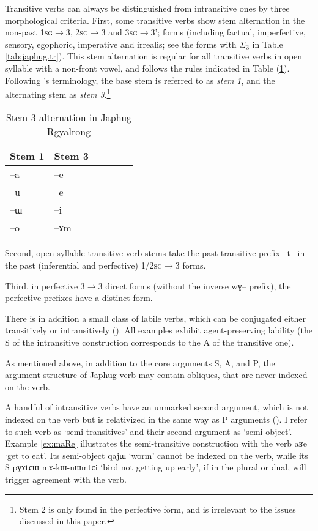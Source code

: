 \documentclass[oldfontcommands,oneside,a4paper,11pt]{article}
\newcommand{\ipa}[1]{{\phon \mbox{#1}}} %
\newcommand{\refb}[1]{(\ref{#1})}
\newcommand{\sigc}{$\Sigma_3$}
\begin{document}
Transitive verbs can always be distinguished from intransitive ones by three morphological criteria. First, some transitive verbs show stem alternation in the non-past \textsc{1sg}$\rightarrow$3, \textsc{2sg}$\rightarrow$3 and \textsc{3sg}$\rightarrow$3'; forms (including factual, imperfective, sensory, egophoric, imperative and irrealis; see the forms with \sigc{} in Table \ref{tab:japhug.tr}). This stem alternation is regular for all transitive verbs in open syllable with a non-front vowel, and follows the rules indicated  in Table \refb{tab:stem3}. Following \citet{jackson00puxi}'s terminology, the base stem is referred to as \textit{stem 1}, and the alternating stem as \textit{stem 3}.\footnote{Stem 2 is only found in the perfective form, and is irrelevant to the issues discussed in this paper.}

 \begin{table} 
\caption{Stem 3 alternation in Japhug Rgyalrong} \label{tab:stem3} \centering
\begin{tabular}{llllll}
\toprule
Stem 1 & Stem 3 \\
\midrule
\ipa{--a} & \ipa{--e} \\
\ipa{--u} & \ipa{--e} \\
\ipa{--ɯ} & \ipa{--i} \\
\ipa{--o} & \ipa{--ɤm} \\
\bottomrule
\end{tabular}
\end{table}

 Second, open syllable transitive verb stems take the past transitive prefix \ipa{--t--} in the past (inferential and perfective) \textsc{1/2sg}$\rightarrow$3 forms. 
 
 
 Third, in perfective 3$\rightarrow$3 direct forms (without the inverse \ipa{wɣ--} prefix), the perfective prefixes have a distinct form.

There is in addition a small class of labile verbs, which can be conjugated either transitively or intransitively (\citealt{jacques12demotion}). All examples exhibit agent-preserving  lability (the S of the intransitive construction corresponds to the A of the transitive one).
  
As mentioned above, in addition to the core arguments S, A, and P, the argument structure of Japhug verb may contain obliques, that are never indexed on the verb.
  
A handful of intransitive verbs have an unmarked second argument, which is not indexed on the verb but is relativized in the same way as P arguments (\citealt{jacques14relatives}). I refer to such verb as `semi-transitives' and their second argument as `semi-object'.  Example \ref{ex:maRe} illustrates the semi-transitive construction with the verb \ipa{aʁe} `get to eat'. Its semi-object \ipa{qajɯ} `worm' cannot be indexed on the verb, while its S \ipa{pɣɤtɕɯ}  	\ipa{mɤ-kɯ-nɯmtɕi}  `bird not getting up early', if in the plural or dual, will trigger agreement with the verb.
  
\end{document}
